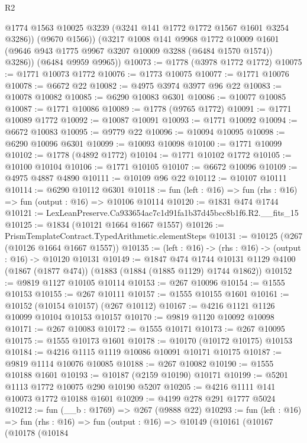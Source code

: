 \begin{lexlean}{R2}
\begin{coremodule}
            @1774
            @1563
            @10025
            @3239
            (@3241 @141 @1772 @1772 @1567 @1601 @3254 @3286))
          (@9670 @1566))
        (@3217
          @1008
          @141
          @9968
          @1772
          @10009
          @1601
          (@9646 @943 @1775 @9967 @3207 @10009 @3288 (@6484 @1570 @1574))
          @3286))
      (@6484 @9959 @9965))
@10073 := @1778 (@3978 @1772 @1772)
@10075 := @1771 @10073 @1772
@10076 := @1773 @10075
@10077 := @1771 @10076
@10078 := @6672 @22
@10082 := @4975 @3974 @3977 @96 @22
@10083 := @10078 @10082
@10085 := @6290 @10083 @6301
@10086 := @10077 @10085
@10087 := @1771 @10086
@10089 := @1778 (@9765 @1772)
@10091 := @1771 @10089 @1772
@10092 := @10087 @10091
@10093 := @1771 @10092
@10094 := @6672 @10083
@10095 := @9779 @22
@10096 := @10094 @10095
@10098 := @6290 @10096 @6301
@10099 := @10093 @10098
@10100 := @1771 @10099
@10102 := @1778 (@4892 @1772)
@10104 := @1771 @10102 @1772
@10105 := @10100 @10104
@10106 := @1771 @10105
@10107 := @6672 @10096
@10109 := @4975 @4887 @4890
@10111 := @10109 @96 @22
@10112 := @10107 @10111
@10114 := @6290 @10112 @6301
@10118 := fun (left : @16) => fun (rhs : @16) => fun (output : @16) => @10106 @10114
@10120 := @1831 @474 @1744
@10121 := LexLeanPreserve.Ca933654ac7c1d91fa1b37d45bcc8b1f6.R2.__fits_15
@10125 := @1834 (@10121 @1664 @1667 @1557)
@10126 := PrismTemplateContract.TypedArithmetic.elementSteps
@10131 := @10125 (@267 (@10126 @1664 @1667 @1557))
@10135 := (left : @16) -> (rhs : @16) -> (output : @16) -> @10120 @10131
@10149 := @1847
    @474
    @1744
    @10131
    @1129
    @4100
    (@1867 (@1877 @474))
    (@1883 (@1884 (@1885 @1129) @1744 @1862))
@10152 := @9819 @1127 @10105 @10114
@10153 := @267 @10096
@10154 := @1555 @10153
@10155 := @267 @10111
@10157 := @1555 @10155 @1601
@10161 := @10152 (@10154 @10157) (@267 @10112)
@10167 := @4216 @1121 @1126 @10099 @10104 @10153 @10157
@10170 := @9819 @1120 @10092 @10098
@10171 := @267 @10083
@10172 := @1555 @10171
@10173 := @267 @10095
@10175 := @1555 @10173 @1601
@10178 := @10170 (@10172 @10175) @10153
@10184 := @4216 @1115 @1119 @10086 @10091 @10171 @10175
@10187 := @9819 @1114 @10076 @10085
@10188 := @267 @10082
@10190 := @1555 @10188 @1601
@10193 := @10187 (@2159 @10190) @10171
@10199 := @5201 @1113 @1772 @10075 @290 @10190 @5207
@10205 := @4216 @1111 @141 @10073 @1772 @10188 @1601
@10209 := @4199 @278 @291 @1777 @5024
@10212 := fun (__b : @1769) => @267 (@9888 @22)
@10293 := fun (left : @16) =>
  fun (rhs : @16) =>
  fun (output : @16) =>
  @10149
    (@10161
      (@10167
        (@10178
          (@10184

\end{coremodule}
\end{lexlean}
